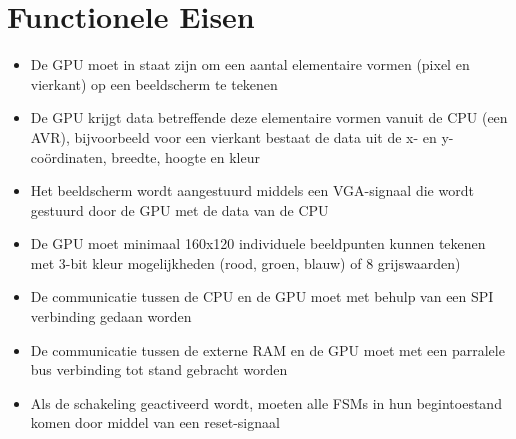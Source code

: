 \documentclass{scrartcl} %
\begin{document}
\section {Functionele Eisen}
\begin {itemize}
\item De GPU moet in staat zijn om een aantal elementaire vormen (pixel en vierkant) op een beeldscherm te tekenen
\item De GPU krijgt data betreffende deze elementaire vormen vanuit de CPU (een AVR), bijvoorbeeld voor een vierkant bestaat de data uit de x- en y-coördinaten, breedte, hoogte en kleur
\item Het beeldscherm wordt aangestuurd middels een VGA-signaal die wordt gestuurd door de GPU met de data van de CPU
\item De GPU moet minimaal 160x120 individuele beeldpunten kunnen tekenen met 3-bit kleur mogelijkheden (rood, groen, blauw) of 8 grijswaarden)
\item De communicatie tussen de CPU en de GPU moet met behulp van een SPI verbinding gedaan worden
\item De communicatie tussen de externe RAM en de GPU moet met een parralele bus verbinding tot stand gebracht worden
\item Als de schakeling geactiveerd wordt, moeten alle FSMs in hun begintoestand komen door middel van een reset-signaal
\end{itemize}
\end{document}
